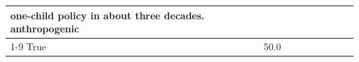 \begin{table}[H]
\begin{tabular}{lllrlllll}
one-child policy in about three decades. anthropogenic \\
\cline{1-9}
True & 50.0%
\end{tabular}
\end{table}
